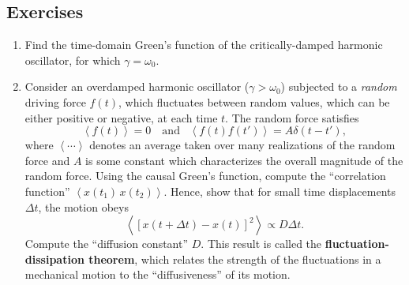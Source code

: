 \documentclass[10pt,a4paper]{article}
\begin{document}
\subsection{Exercises}\label{exercises}

\begin{enumerate}
\item
  Find the time-domain Green's function of the critically-damped
  harmonic oscillator, for which $\gamma = \omega_0$.
\item
  Consider an overdamped harmonic oscillator ($\gamma > \omega_0$)
  subjected to a \emph{random} driving force $f(t)$, which fluctuates
  between random values, which can be either positive or negative, at
  each time $t$. The random force satisfies
  \begin{equation}
    \left\langle f(t)\right\rangle = 0 \quad\mathrm{and}\;\;\;\left\langle f(t) f(t')\right\rangle = A \delta(t-t'),
  \end{equation}
  where $\left\langle\cdots\right\rangle$ denotes an average taken
  over many realizations of the random force and $A$ is some constant
  which characterizes the overall magnitude of the random force. Using
  the causal Green's function, compute the ``correlation function''
  $\left\langle x(t_1)\, x(t_2) \right\rangle$. Hence, show that for
  small time displacements $\Delta t$, the motion obeys
  \begin{equation}
    \left\langle [x(t+\Delta t) - x(t)]^2 \right\rangle \propto D \Delta t.
  \end{equation}
  Compute the ``diffusion constant'' $D$. This result is called the
  \textbf{fluctuation-dissipation theorem}, which relates the strength
  of the fluctuations in a mechanical motion to the ``diffusiveness''
  of its motion.
\end{enumerate}
\end{document}
